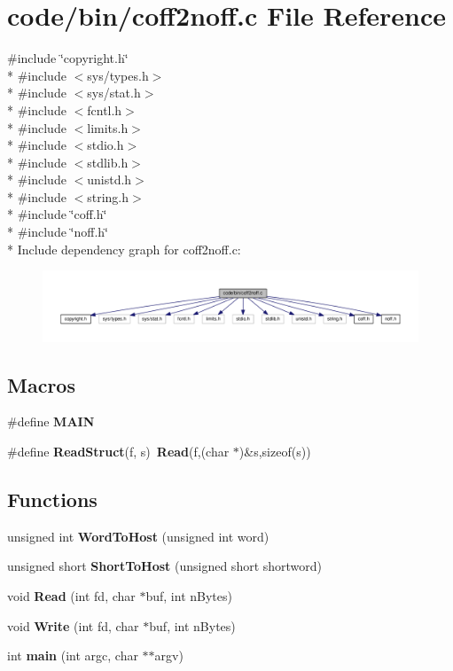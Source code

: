 \section{code/bin/coff2noff.c File Reference}
\label{coff2noff_8c}
{\ttfamily \#include \char`\"{}copyright.\+h\char`\"{}}\\*
{\ttfamily \#include $<$sys/types.\+h$>$}\\*
{\ttfamily \#include $<$sys/stat.\+h$>$}\\*
{\ttfamily \#include $<$fcntl.\+h$>$}\\*
{\ttfamily \#include $<$limits.\+h$>$}\\*
{\ttfamily \#include $<$stdio.\+h$>$}\\*
{\ttfamily \#include $<$stdlib.\+h$>$}\\*
{\ttfamily \#include $<$unistd.\+h$>$}\\*
{\ttfamily \#include $<$string.\+h$>$}\\*
{\ttfamily \#include \char`\"{}coff.\+h\char`\"{}}\\*
{\ttfamily \#include \char`\"{}noff.\+h\char`\"{}}\\*
Include dependency graph for coff2noff.\+c\+:
\nopagebreak
\begin{figure}[H]
\begin{center}
\leavevmode
\includegraphics[width=350pt]{coff2noff_8c__incl}
\end{center}
\end{figure}
\subsection*{Macros}
\begin{DoxyCompactItemize}
\item 
\#define {\bf M\+A\+IN}
\item 
\#define {\bf Read\+Struct}(f,  s)~{\bf Read}(f,(char $\ast$)\&s,sizeof(s))
\end{DoxyCompactItemize}
\subsection*{Functions}
\begin{DoxyCompactItemize}
\item 
unsigned int {\bf Word\+To\+Host} (unsigned int word)
\item 
unsigned short {\bf Short\+To\+Host} (unsigned short shortword)
\item 
void {\bf Read} (int fd, char $\ast$buf, int n\+Bytes)
\item 
void {\bf Write} (int fd, char $\ast$buf, int n\+Bytes)
\item 
int {\bf main} (int argc, char $\ast$$\ast$argv)
\end{DoxyCompactItemize}
